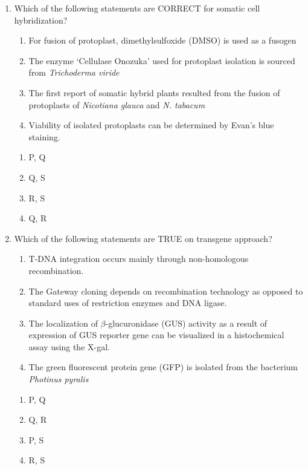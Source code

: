 \documentclass[journal,12pt,onecolumn]{IEEEtran}
\begin{document}
\begin{enumerate}[label=\arabic*.]
\item Which of the following statements are CORRECT for somatic cell hybridization?
\begin{enumerate}[label=\Alph*. ,start=16]
\item For fusion of protoplast, dimethylsulfoxide (DMSO) is used as a fusogen
\item The enzyme ‘Cellulase Onozuka’ used for protoplast isolation is sourced from \textit{Trichoderma viride}
\item The first report of somatic hybrid plants resulted from the fusion of protoplasts of \textit{Nicotiana glauca} and \textit{N. tabacum}
\item Viability of isolated protoplasts can be determined by Evan’s blue staining.
\end{enumerate}
\begin{multicols}{4}
\begin{enumerate}[label=(\Alph*)]
\item P, Q
\item Q, S
\item R, S
\item Q, R
\end{enumerate}
\end{multicols}

\item Which of the following statements are TRUE on transgene approach?
\begin{enumerate}[label=\Alph*. ,start=16]
\item T-DNA integration occurs mainly through non-homologous recombination.
\item The Gateway cloning depends on recombination technology as opposed to standard uses of restriction enzymes and DNA ligase.
\item The localization of $\beta$-glucuronidase (GUS) activity as a result of expression of GUS reporter gene can be visualized in a histochemical assay using the X-gal.
\item The green fluorescent protein gene (GFP) is isolated from the bacterium \textit{Photinus pyralis}
\end{enumerate}
\begin{multicols}{4}
\begin{enumerate}[label=(\Alph*)]
\item P, Q
\item Q, R
\item P, S
\item R, S
\end{enumerate}
\end{multicols}


\end{enumerate}
\end{document}

